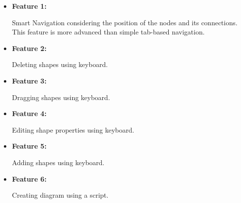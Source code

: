 \begin{itemize}
\item {\bf Feature 1:}
\par \noindent
Smart Navigation considering the position of the nodes and its connections. This feature is more advanced than simple tab-based navigation.

\item {\bf Feature 2:}
\par \noindent
Deleting shapes using keyboard.

\item {\bf Feature 3:}
\par \noindent
Dragging shapes using keyboard.

\item {\bf Feature 4:}
\par \noindent
Editing shape properties using keyboard.

\item {\bf Feature 5:}
\par \noindent
Adding shapes using keyboard.

\item {\bf Feature 6:}
\par \noindent
Creating diagram using a script.
\end{itemize}

